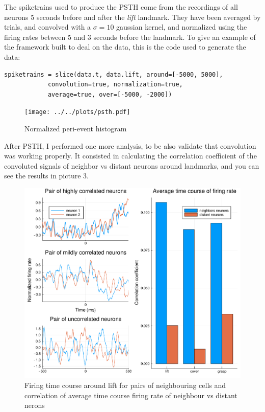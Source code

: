 The spiketrains used to produce the PSTH come from the recordings of all neurons 5 seconds before and after the \emph{lift} landmark. They have been averaged by trials, and convolved with a $\sigma=10$ gaussian kernel, and normalized using the firing rates between 5 and 3 seconds before the landmark. To give an example of the framework built to deal on the data, this is the code used to generate the data:
\begin{lstlisting}[frame=single]
spiketrains = slice(data.t, data.lift, around=[-5000, 5000], 
		    convolution=true, normalization=true, 
		    average=true, over=[-5000, -2000])
\end{lstlisting}
\begin{figure}[h]
	\centering
	\texttt{[image: ../../plots/psth.pdf]}
	\caption{Normalized peri-event histogram}
	\label{fig:psth}
\end{figure}


After PSTH, I performed one more analysis, to be also validate that convolution was working properly. It consisted in calculating the correlation coefficient of the convoluted signals of neighbor vs distant neurons around landmarks, and you can see the results in picture 3.

\begin{figure}[h]
	\centering
	\includegraphics[scale=0.5]{../../plots/corr-coef.pdf}
	\caption{Firing time course around lift for pairs of neighbouring cells and correlation of average time course firing rate of neighbour vs distant nerons}
	\label{fig:corr-coeff}
\end{figure}

